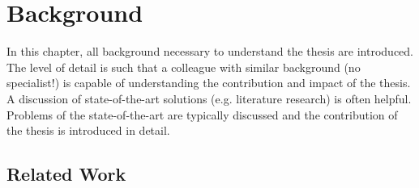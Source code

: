 \chapter{Background}

In this chapter, all background necessary to understand the thesis are introduced. The level of detail is such that a colleague with similar background (no specialist!) is capable of understanding the contribution and impact of the thesis. A discussion of state-of-the-art solutions (e.g. literature research) is often helpful. Problems of the state-of-the-art are typically discussed and the contribution of the thesis is introduced in detail. 

\section{Related Work}
